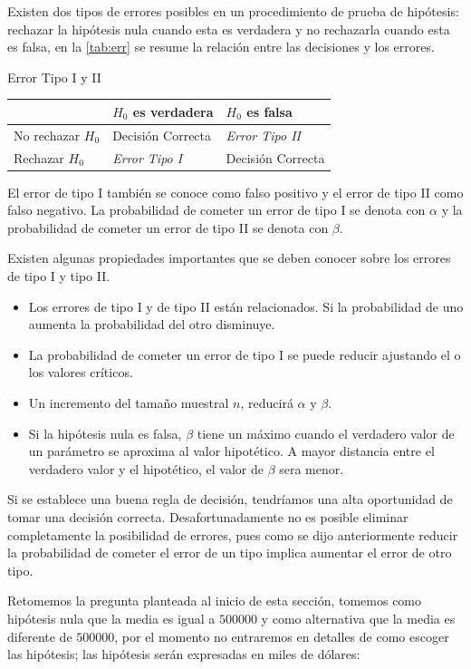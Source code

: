 \documentclass[]{book}
\providecommand{\tightlist}{%
  \setlength{\itemsep}{0pt}\setlength{\parskip}{0pt}}
\begin{document}
Existen dos tipos de errores posibles en un procedimiento de prueba de
hipótesis: rechazar la hipótesis nula cuando esta es verdadera y no
rechazarla cuando esta es falsa, en la \ref{tab:err} se resume la
relación entre las decisiones y los errores.

\label{tab:err} Error Tipo I y II

\begin{longtable}[]{@{}lll@{}}
\toprule
& \(H_0\) es verdadera & \(H_0\) es falsa\tabularnewline
\midrule
\endhead
No rechazar \(H_0\) & Decisión Correcta & \emph{Error Tipo
II}\tabularnewline
Rechazar \(H_0\) & \emph{Error Tipo I} & Decisión
Correcta\tabularnewline
\bottomrule
\end{longtable}

El error de tipo I también se conoce como falso positivo y el error de
tipo II como falso negativo. La probabilidad de cometer un error de tipo
I se denota con \(\alpha\) y la probabilidad de cometer un error de tipo
II se denota con \(\beta\).

Existen algunas propiedades importantes que se deben conocer sobre los
errores de tipo I y tipo II.

\begin{itemize}
\tightlist
\item
  Los errores de tipo I y de tipo II están relacionados. Si la
  probabilidad de uno aumenta la probabilidad del otro disminuye.
\item
  La probabilidad de cometer un error de tipo I se puede reducir
  ajustando el o los valores críticos.
\item
  Un incremento del tamaño muestral \(n\), reducirá \(\alpha\) y
  \(\beta\).
\item
  Si la hipótesis nula es falsa, \(\beta\) tiene un máximo cuando el
  verdadero valor de un parámetro se aproxima al valor hipotético. A
  mayor distancia entre el verdadero valor y el hipotético, el valor de
  \(\beta\) sera menor.
\end{itemize}

Si se establece una buena regla de decisión, tendríamos una alta
oportunidad de tomar una decisión correcta. Desafortunadamente no es
posible eliminar completamente la posibilidad de errores, pues como se
dijo anteriormente reducir la probabilidad de cometer el error de un
tipo implica aumentar el error de otro tipo.

Retomemos la pregunta planteada al inicio de esta sección, tomemos como
hipótesis nula que la media es igual a \(500000\) y como alternativa que
la media es diferente de \(500000\), por el momento no entraremos en
detalles de como escoger las hipótesis; las hipótesis serán expresadas
en miles de dólares:
\end{document}
